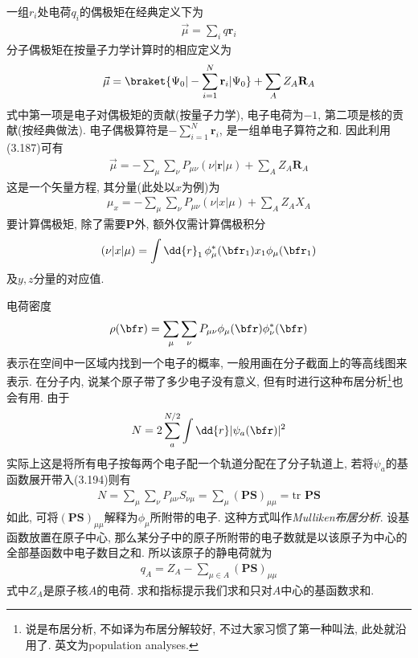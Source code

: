 一组$r_i$处电荷$q_i$的偶极矩在经典定义下为
\begin{align}
\vec{\mu} = \sum_i q\mathbf{r}_i
\end{align}
分子偶极矩在按量子力学计算时的相应定义为
\begin{align}
\vec{\mu} = \braket{\Psi_0|-\sum_{i=1}^{N}\mathbf{r}_i|\Psi_0} + \sum_AZ_A\mathbf{R}_A
\end{align}
式中第一项是电子对偶极矩的贡献(按量子力学), 电子电荷为$-1$, 第二项是核的贡献(按经典做法). 电子偶极算符是$-\sum_{i=1}^{N}\mathbf{r}_i$, 是一组单电子算符之和. 因此利用(3.187)可有
\begin{align}
\vec{\mu} = -\sum_\mu\sum_\nu P_{\mu\nu}(\nu|\mathbf{r}|\mu) + \sum_AZ_A\mathbf{R}_A
\end{align}
这是一个矢量方程, 其分量(此处以$x$为例)为
\begin{align}
\mu_x = -\sum_\mu\sum_\nu P_{\mu\nu}(\nu|x|\mu) + \sum_AZ_AX_A
\end{align}
要计算偶极矩, 除了需要$\mathbf{P}$外, 额外仅需计算偶极积分
\begin{align}
(\nu|x|\mu) = \int\dd{r}_1\,\phi_\mu^*(\bfr_1)x_1\phi_\mu(\bfr_1)
\end{align}
及$y,z$分量的对应值.

电荷密度
\begin{align}
\rho(\bfr) = \sum_\mu\sum_\nu P_{\mu\nu}\phi_\mu(\bfr)\phi_\nu^*(\bfr)
\end{align}
表示在空间中一区域内找到一个电子的概率, 一般用画在分子截面上的等高线图来表示. 在分子内, 说某个原子带了多少电子没有意义, 但有时进行这种布居分析\footnote{
说是布居分析, 不如译为布居分解较好, 不过大家习惯了第一种叫法, 此处就沿用了. 英文为population analyses.
}也会有用. 由于
\begin{align}
N = 2\sum_{a}^{N/2}\int\dd{r}|\psi_a(\bfr)|^2
\end{align}
实际上这是将所有电子按每两个电子配一个轨道分配在了分子轨道上, 若将$\psi_a$的基函数展开带入(3.194)则有
\begin{align}
N = \sum_\mu\sum_\nu P_{\mu\nu}S_{\nu\mu} = \sum_\mu(\mathbf{PS})_{\mu\mu} = \mathrm{tr}\,\,\mathbf{PS}
\end{align}
如此, 可将$(\mathbf{PS})_{\mu\mu}$解释为$\phi_\mu$所附带的电子. 这种方式叫作\emph{Mulliken布居分析}. 设基函数放置在原子中心, 那么某分子中的原子所附带的电子数就是以该原子为中心的全部基函数中电子数目之和. 所以该原子的静电荷就为
\begin{align}
q_A = Z_A - \sum_{\mu\in A}(\mathbf{PS})_{\mu\mu}
\end{align}
式中$Z_A$是原子核$A$的电荷. 求和指标提示我们求和只对$A$中心的基函数求和.

